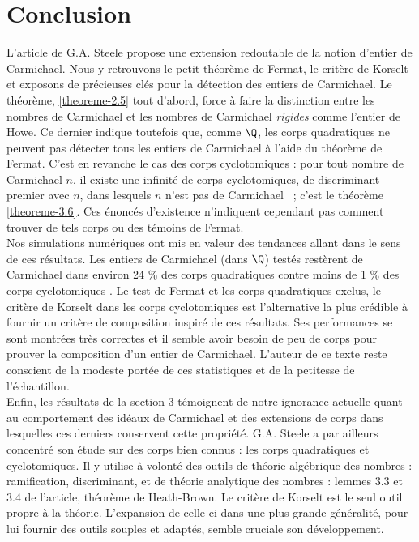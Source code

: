 \section*{Conclusion}

L'article de G.A. Steele propose une extension redoutable  de la notion d'entier de Carmichael. Nous y retrouvons le petit théorème de Fermat, le critère de Korselt et exposons de précieuses clés pour la détection des entiers de Carmichael. Le théorème, \ref{theoreme-2.5} tout d'abord, force à faire la distinction entre les nombres de Carmichael et les nombres de Carmichael \emph{rigides} comme l'entier de Howe. Ce dernier indique toutefois que, comme $\Q$, les corps quadratiques ne peuvent pas détecter tous les entiers de Carmichael à l'aide du théorème de Fermat. C'est en revanche le cas des corps cyclotomiques : pour tout nombre de Carmichael $n$, il existe une infinité de corps cyclotomiques, de discriminant premier avec $n$, dans lesquels $n$ n'est pas de Carmichael ~; c'est le théorème \ref{theoreme-3.6}. Ces énoncés d'existence n'indiquent cependant pas comment trouver de tels corps ou des témoins de Fermat. \\

Nos simulations numériques ont mis en valeur des tendances allant dans le sens de ces résultats. Les entiers de Carmichael (dans $\Q$) testés restèrent de Carmichael dans environ 24 \% des corps quadratiques  contre moins de 1 \% des corps cyclotomiques . Le test de Fermat et les corps quadratiques exclus, le critère de Korselt dans les corps cyclotomiques  est l'alternative la plus crédible à fournir un critère de composition inspiré de ces résultats. Ses performances se sont montrées très correctes et il semble avoir besoin de peu de corps pour prouver la composition d'un entier de Carmichael. L'auteur de ce texte reste conscient de la modeste portée de ces statistiques et de la petitesse de l'échantillon. \\

Enfin, les résultats de la section 3 témoignent de notre ignorance actuelle quant au comportement des idéaux de Carmichael et des extensions de corps dans lesquelles ces derniers conservent cette propriété. G.A. Steele a par ailleurs concentré son étude sur des corps bien connus : les corps quadratiques et cyclotomiques. Il y utilise à volonté des outils de théorie algébrique des nombres : ramification, discriminant, et de théorie analytique des nombres : lemmes 3.3 et 3.4 de l'article, théorème de Heath-Brown. Le critère de Korselt est le seul outil propre à la théorie. L'expansion de celle-ci dans une plus grande généralité, pour lui fournir des outils souples et adaptés, semble cruciale son développement.
